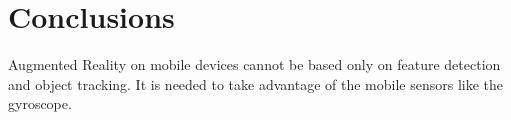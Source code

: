 \chapter{Conclusions}
Augmented Reality on mobile devices cannot be based only on feature detection and
object tracking. It is needed to take advantage of the mobile sensors like the
gyroscope. 
